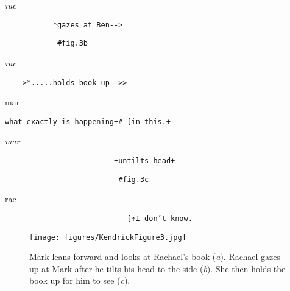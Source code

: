 \documentclass[output=paper,nonflat,modfont,draft]{langsci/langscibook}
\begin{document}
\begin{transbox}{11}{\textit{rac}}
\begin{verbatim}
           *gazes at Ben-->
\end{verbatim}
\end{transbox}

\begin{transbox}{12}{\fig}
\begin{verbatim}
            #fig.3b
\end{verbatim}
\end{transbox}


\begin{mdframedkendrick}[style=secondfoc]
\begin{transbox}{14}{\textit{rac}}
\begin{verbatim}
  -->*.....holds book up-->>
\end{verbatim}
\end{transbox}
\end{mdframedkendrick}\vspace{-5mm}

\begin{transbox}{15}{mar}
\begin{verbatim}
what exactly is happening+# [in this.+
\end{verbatim}
\end{transbox}

\begin{transbox}{16}{\textit{mar}}
\begin{verbatim}
                         +untilts head+
\end{verbatim}
\end{transbox}

\begin{transbox}{17}{\fig}
\begin{verbatim}
                          #fig.3c
\end{verbatim}
\end{transbox}

\begin{transbox}{18}{rac}
\begin{verbatim}
                            [↑I don’t know.
\end{verbatim}
\end{transbox}\bigskip

\begin{figure}
\caption{ Mark leans forward and looks at Rachael’s book (\textit{a}). Rachael gazes up at Mark after he tilts his head to the side (\textit{b}). She then holds the book up for him to see (\textit{c}).}
\texttt{[image: figures/KendrickFigure3.jpg]}
\label{fig:kendrick:3}
\end{figure}
\end{document}
